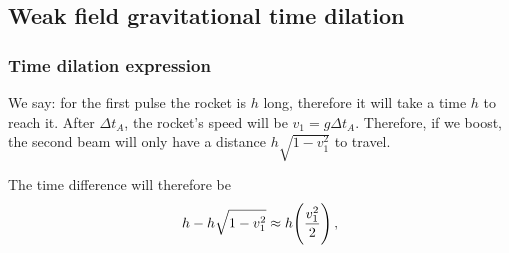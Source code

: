 \documentclass[main.tex]{subfiles}
\begin{document}
\subsection{Weak field gravitational time dilation}

\subsubsection{Time dilation expression}

We say: for the first pulse the rocket is \(h\) long, therefore it will take a time \(h\) to reach it. After \(\Delta t _A\), the rocket's speed will be \(v_1 = g \Delta t_A\). 
Therefore, if we boost, the second beam will only have a distance \(h \sqrt{1 - v_1^2} \) to travel.

The time difference will therefore be 
%
\begin{equation}
  h - h \sqrt{1- v_1^2} \approx h \qty(\frac{v_1 ^2}{2}) 
\,,
\end{equation}
%
\end{document}
